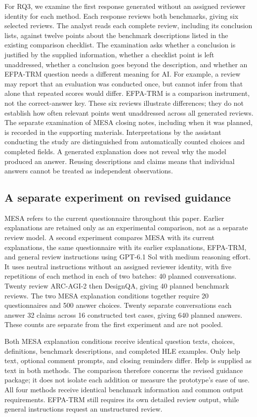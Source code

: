 \documentclass[10pt,conference]{IEEEtran}
\begin{document}
For RQ3, we examine the first response generated without an assigned reviewer identity for each method. Each response reviews both benchmarks, giving six selected reviews. The analyst reads each complete review, including its conclusion lists, against twelve points about the benchmark descriptions listed in the existing comparison checklist. The examination asks whether a conclusion is justified by the supplied information, whether a checklist point is left unaddressed, whether a conclusion goes beyond the description, and whether an EFPA-TRM question needs a different meaning for AI. For example, a review may report that an evaluation was conducted once, but cannot infer from that alone that repeated scores would differ. EFPA-TRM is a comparison instrument, not the correct-answer key. These six reviews illustrate differences; they do not establish how often relevant points went unaddressed across all generated reviews. The separate examination of MESA closing notes, including when it was planned, is recorded in the supporting materials. Interpretations by the assistant conducting the study are distinguished from automatically counted choices and completed fields. A generated explanation does not reveal why the model produced an answer. Reusing descriptions and claims means that individual answers cannot be treated as independent observations.

\subsection{A separate experiment on revised guidance}
MESA refers to the current questionnaire throughout this paper. Earlier explanations are retained only as an experimental comparison, not as a separate review model. A second experiment compares MESA with its current explanations, the same questionnaire with its earlier explanations, EFPA-TRM, and general review instructions using GPT-6.1 Sol with medium reasoning effort. It uses neutral instructions without an assigned reviewer identity, with five repetitions of each method in each of two batches: 40 planned conversations. Twenty review ARC-AGI-2 then DesignQA, giving 40 planned benchmark reviews. The two MESA explanation conditions together require 20 questionnaires and 500 answer choices. Twenty separate conversations each answer 32 claims across 16 constructed test cases, giving 640 planned answers. These counts are separate from the first experiment and are not pooled.

Both MESA explanation conditions receive identical question texts, choices, definitions, benchmark descriptions, and completed HLE examples. Only help text, optional comment prompts, and closing reminders differ. Help is supplied as text in both methods. The comparison therefore concerns the revised guidance package; it does not isolate each addition or measure the prototype's ease of use. All four methods receive identical benchmark information and common output requirements. EFPA-TRM still requires its own detailed review output, while general instructions request an unstructured review.
\end{document}
